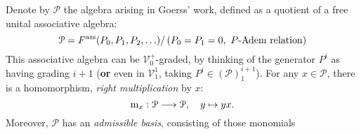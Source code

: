 \documentclass[11pt]{amsart}
\theoremstyle{plain}
\theoremstyle{definition}
\renewcommand{\to}{\longrightarrow}
\newcommand{\scrL}{\mathscr{L}}
\newcommand{\scrC}{\mathscr{C}}
\newcommand{\calU}{\mathcal{U}}
\newcommand{\calP}{\mathcal{P}}
\newcommand{\calV}{\mathcal{V}}
\newcommand{\calw}{\mathcal{W}}
\theoremstyle{plain}
\newcommand{\Palg}{{\calP}}
\newcommand{\LieOperad}{{\scrL}}
\newcommand{\vect}[2]{\calV^{#1}_{#2}}
\newcommand{\algs}{{\scrC\!\textit{om}}}
\begin{document}
\begin{Constructing (co)homotopy operations}
%
%
\begin{shaded}\tiny
Denote by $\Palg$ the algebra arising in Goerss' work, defined as a quotient of a free unital associative algebra:
\[\Palg=F^{\textup{ass}}(P_0,P_1,P_2,\ldots)/\left(P_0=P_1=0,\ \textup{$P$-Adem relation}\right)\]
This associative algebra can be $\vect{+}{0}$-graded, by thinking of the generator $P^i$ as having grading $i+1$ (\textbf{or} even in $\vect{1}{1}$, taking $P^i\in(\Palg)^{i+1}_1$). For any $x\in\Palg$, there is a homomorphism, \emph{right multiplication} by $x$:
\[\textup{m}_x:\Palg\to \Palg,\quad y\mapsto yx.\]
Moreover, $\Palg$ has an \emph{admissible basis}, consisting of those monomials

\end{shaded}
\end{Constructing (co)homotopy operations}
\end{document}
